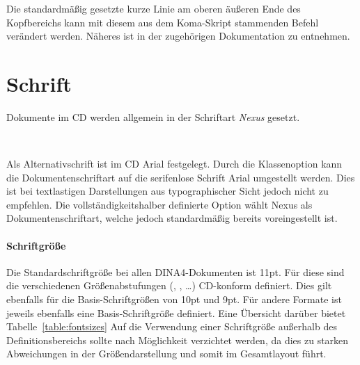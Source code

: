 Die standardmäßig gesetzte kurze Linie am oberen äußeren Ende des
Kopfbereichs kann mit diesem aus dem Koma-Skript stammenden Befehl verändert
werden. Näheres ist in der zugehörigen Dokumentation zu
entnehmen\cite{koma-skript}.


\section{Schrift}\label{subsec:documents:fonts}

Dokumente im \acs{CD} werden allgemein in der Schriftart \emph{Nexus}
gesetzt.

\begin{Declaration}
  \\
\end{Declaration}

Als Alternativschrift ist im \acs{CD} Arial festgelegt. Durch die Klassenoption
 kann die Dokumentenschriftart auf die serifenlose Schrift
Arial umgestellt werden. Dies ist bei textlastigen Darstellungen aus
typographischer Sicht jedoch nicht zu empfehlen.
Die vollständigkeitshalber definierte Option  wählt Nexus als 
Dokumentenschriftart, welche jedoch standardmäßig bereits voreingestellt ist.


\paragraph{Schriftgröße}

Die Standardschriftgröße bei allen DINA4-Dokumenten ist 11pt.
Für diese sind die verschiedenen Größenabstufungen
(, , \ldots) \acs{CD}-konform definiert.
Dies gilt ebenfalls für die Basis-Schriftgrößen von 10pt und 9pt.
Für andere Formate ist jeweils ebenfalls eine Basis-Schriftgröße definiert.
Eine Übersicht darüber bietet Tabelle~\ref{table:fontsizes}
Auf die Verwendung einer Schriftgröße außerhalb des Definitionsbereichs sollte
nach Möglichkeit verzichtet werden, da dies zu starken Abweichungen in der
Größendarstellung und somit im Gesamtlayout führt.

